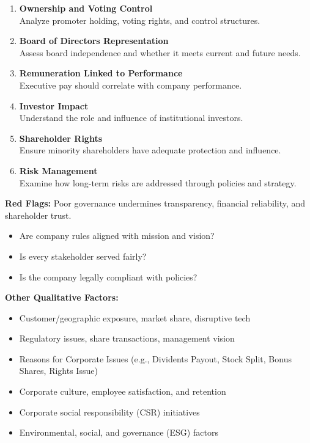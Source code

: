 \documentclass[12pt]{article}
\begin{document}
\begin{enumerate}
  \item \textbf{Ownership and Voting Control} \\
    Analyze promoter holding, voting rights, and control structures.
  
  \item \textbf{Board of Directors Representation} \\
    Assess board independence and whether it meets current and future needs.
  
  \item \textbf{Remuneration Linked to Performance} \\
    Executive pay should correlate with company performance.
  
  \item \textbf{Investor Impact} \\
    Understand the role and influence of institutional investors.
  
  \item \textbf{Shareholder Rights} \\
    Ensure minority shareholders have adequate protection and influence.
  
  \item \textbf{Risk Management} \\
    Examine how long-term risks are addressed through policies and strategy.
\end{enumerate}

\textbf{Red Flags:} Poor governance undermines transparency, financial reliability, and shareholder trust.

\begin{itemize}
  \item Are company rules aligned with mission and vision?
  \item Is every stakeholder served fairly?
  \item Is the company legally compliant with policies?
\end{itemize}

\vspace{0.5em}
\textbf{Other Qualitative Factors:}
\begin{itemize}
  \item Customer/geographic exposure, market share, disruptive tech
  \item Regulatory issues, share transactions, management vision
  \item Reasons for Corporate Issues (e.g., Dividents Payout, Stock Split, Bonus Shares, Rights Issue)
  \item Corporate culture, employee satisfaction, and retention
  \item Corporate social responsibility (CSR) initiatives
  \item Environmental, social, and governance (ESG) factors
\end{itemize}
\end{document}
